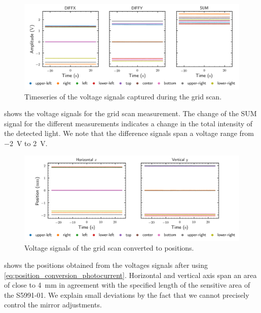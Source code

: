 \begin{figure}[htb]
	\centering
	\includegraphics[scale=0.7]{figure/plot/voltages}
	\caption{Timeseries of the voltage signals captured during the grid scan.}\label{fig:grid_scan_voltages}
\end{figure}
 shows the voltage signals for the grid scan measurement.
The change of the SUM signal for the different measurements indicates a change in the total intensity of the detected light.
We note that the difference signals span a voltage range from \SI{-2}{\volt} to \SI{+2}{\volt}.

\begin{figure}[htb]
	\centering
	\includegraphics[scale=0.7]{figure/plot/positions}
	\caption{Voltage signals of the grid scan converted to positions.}\label{fig:grid_scan_positions}
\end{figure}
 shows the positions obtained from the voltages signals after using \cref{eq:position_conversion_photocurrent}.
Horizontal and vertical axis span an area of close to \SI{4}{\milli\meter} in agreement with the specified length of the sensitive area of the S5991-01.
We explain small deviations by the fact that we cannot precisely control the mirror adjustments.

